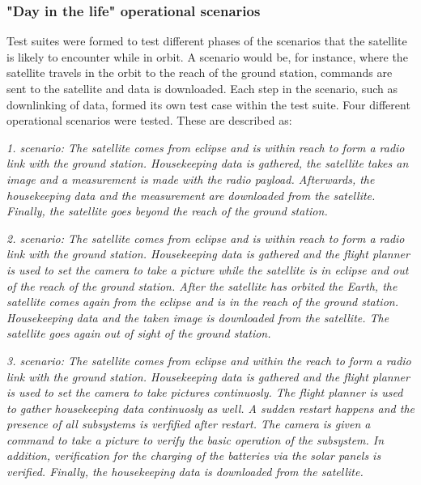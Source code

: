 \documentclass[english,12pt,a4paper,pdftex,elec,utf8]{aaltothesis}
\begin{document}
\subsubsection{"Day in the life" operational scenarios}
Test suites were formed to test different phases of the scenarios that the satellite is likely    to encounter while in orbit. A scenario would be, for instance, where the satellite travels in the orbit to the reach of the ground station, commands are sent to the satellite and data is downloaded. Each step in the scenario, such as downlinking of data, formed its own test case within the test suite. 
Four different operational scenarios were tested. These are described as:
\\
\par 
\textit{1. scenario: The satellite comes from eclipse and is within reach to form a radio link with the ground station. Housekeeping data is gathered, the satellite takes an image and a measurement is made with the radio payload. Afterwards, the housekeeping data and the measurement are downloaded from the satellite. Finally, the satellite goes beyond the reach of the ground station.}
\\
\par 
\textit{2. scenario: The satellite comes from eclipse and is within reach to form a radio link with the ground station. Housekeeping data is gathered and the flight planner is used to set the camera to take a picture while the satellite is in eclipse and out of the reach of the ground station. After the satellite has orbited the Earth, the satellite comes again from the eclipse and is in the reach of the ground station. Housekeeping data and the taken image is downloaded from the satellite. The satellite goes again out of sight of the ground station.}
\\
\par 
\textit{3. scenario: The satellite comes from eclipse and within the reach to form a radio link with the ground station. Housekeeping data is gathered and the flight planner is used to set the camera to take pictures continuosly. The flight planner is used to gather housekeeping data continuosly as well. A sudden restart happens and the presence of all subsystems is verfified after restart. The camera is given a command to take a picture to verify the basic operation of the subsystem. In addition, verification for the charging of the batteries via the solar panels is verified. Finally, the housekeeping data is downloaded from the satellite.}
\\
\par 
\end{document}
